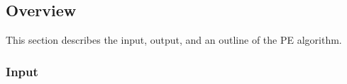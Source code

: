 









\subsection {Overview}
\label{sec:Overview}

This section describes the input, output, and an outline of the PE algorithm. 

\subsubsection {Input}

